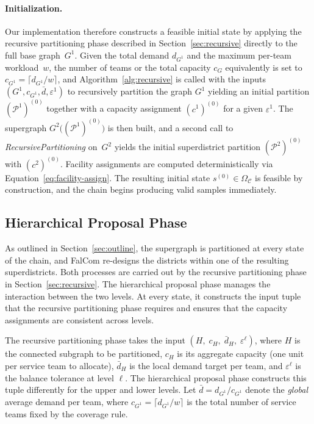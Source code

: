 \documentclass[preprint,12pt,authoryear]{elsarticle}
\theoremstyle{definition}
\begin{document}
\paragraph{Initialization.} Our implementation therefore constructs a feasible initial state by applying the recursive partitioning phase
described in Section~\ref{sec:recursive} directly to the full base graph~$G^1$. Given the total demand $d_{G^1}$ and the maximum per-team workload~$w$, the number of teams or the total capacity $c_G$ equivalently is
set to $c_{G^1} = \lceil d_{G^1} / w \rceil$, and Algorithm~\ref{alg:recursive} is called with the inputs $(G^1, c_{G^1}, \bar{d}, \varepsilon^1)$ to recursively partition the graph $G^1$ yielding an initial partition $(\mathcal{P}^1)^{(0)}$ together with a
capacity assignment $(c^1)^{(0)}$ for a given $\varepsilon^1$. The supergraph $G^2\bigl((\mathcal{P}^1)^{(0)}\bigr)$ is then built, and a second call to \textit{RecursivePartitioning} on~$G^2$ yields the initial superdistrict partition $(\mathcal{P}^2)^{(0)}$ with $(c^2)^{(0)}$.  Facility assignments are computed deterministically via Equation~\eqref{eq:facility-assign}. The resulting initial state $s^{(0)} \in \Omega_\mathcal{C}$ is feasible by construction, and the chain begins producing valid samples immediately.

\subsection{Hierarchical Proposal Phase}
\label{sec:proposal}

As outlined in Section~\ref{sec:outline}, the supergraph is partitioned at every state of the chain, and FalCom re-designs the districts within one of the resulting superdistricts.  Both processes are carried out by the recursive partitioning phase in Section~\ref{sec:recursive}.  The hierarchical proposal phase manages the interaction between the two levels. At every state, it constructs the input tuple that the recursive partitioning phase requires and ensures that the capacity assignments are
consistent across levels.

The recursive partitioning phase takes the input
$(H,\; c_H,\; \bar{d}_H,\; \varepsilon^\ell)$, where $H$ is the connected subgraph to be partitioned, $c_H$ is its aggregate capacity (one unit per service team to allocate), $\bar{d}_H$ is the local demand target per team, and $\varepsilon^{\ell}$ is the balance tolerance at level $\ell$. The hierarchical proposal phase constructs this tuple differently for the upper and lower levels. Let $\bar{d} = d_{G^1} / c_{G^1}$ denote the \emph{global} average demand per team, where $c_{G^1} = \lceil d_{G^1} / w \rceil$ is the total number of service teams fixed by the coverage rule.
\end{document}
